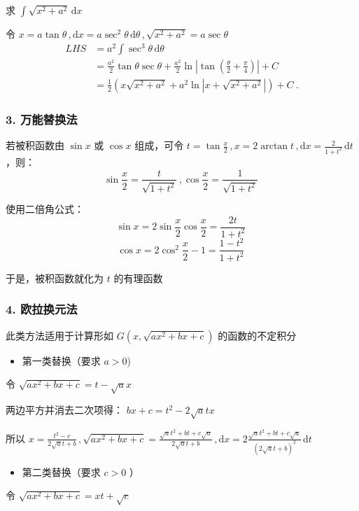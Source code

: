 \begin{example}{}
求 $\displaystyle{\int\sqrt{x^2+a^2}\,\mathrm{d}x}$

令 $x=a\tan \theta\,,\mathrm{d}x=a\sec^2\theta\,\mathrm{d}\theta\,,\sqrt{x^2+a^2}=a\sec\theta$
\begin{equation}
\begin{aligned}
LHS&=a^2\int \sec^3\theta\,\mathrm{d}\theta\\ &=\frac{a^2}{2}\tan\theta\sec\theta+\frac{a^2}{2}\ln\left|\tan\left(\frac{\theta}{2}+\frac{\pi}{4}\right)\right|+C\\ &=\frac{1}{2}\left(x\sqrt{x^2+a^2}+a^2\ln\left|x+\sqrt{x^2+a^2}\right|\right)+C~.
\end{aligned}
\end{equation}

\end{example}

\subsubsection{3. 万能替换法}
若被积函数由 $\sin x$ 或 $\cos x$ 组成，可令 $\displaystyle{t=\tan\frac{x}{2}\,,x=2\arctan t\,,\mathrm{d}x=\frac{2}{1+t^2}\,\mathrm{d}t}$ ，则：
$$\sin\frac{x}{2}=\frac{t}{\sqrt{1+t^2}}\,,\cos \frac{x}{2}=\frac{1}{\sqrt{1+t^2}}~$$

使用二倍角公式：
$$\sin x=2\sin\frac{x}{2}\cos\frac{x}{2}=\frac{2t}{1+t^2}~$$
$$ \cos x=2\cos^2\frac{x}{2}-1=\frac{1-t^2}{1+t^2}~$$

于是，被积函数就化为 $t$ 的有理函数
\subsubsection{4. 欧拉换元法}
此类方法适用于计算形如 $\displaystyle{G\left(x,\sqrt{ax^2+bx+c}\right)}$ 的函数的不定积分

\begin{itemize}
\item 第一类替换（要求 $a>0$)
\end{itemize}
令 $\sqrt{ax^2+bx+c}=t-\sqrt{a}x$

两边平方并消去二次项得： $bx+c=t^2-2\sqrt{a}tx$

所以 $\displaystyle{x=\frac{t^2-c}{2\sqrt{a}t+b}\,,\sqrt{ax^2+bx+c}=\frac{\sqrt{a}t^2+bt+c\sqrt{a}}{2\sqrt{a}t+b}\,,\mathrm{d}x=2\frac{\sqrt{a}t^2+bt+c\sqrt{a}}{(2\sqrt{a}t+b)^2}\,\mathrm{d}t}$

\begin{itemize}
\item 第二类替换（要求 $c>0$ ）
\end{itemize}
令 $\displaystyle{\sqrt{ax^2+bx+c}=xt+\sqrt{c}}$


